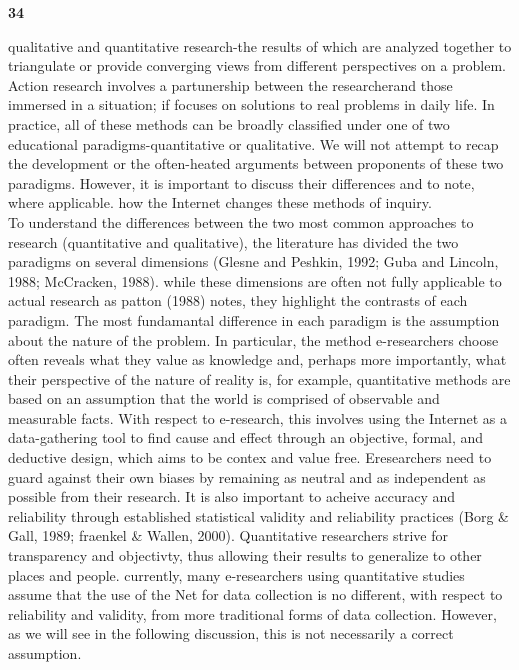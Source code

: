 \documentclass{book}
\begin{document}
\begin{flushright}
\hspace*{0.5cm}
\textbf{34}
\end{flushright}
\vspace*{0.7}
qualitative and quantitative research-the results of which are analyzed together to triangulate or provide converging views from different perspectives on a problem. Action research involves a partunership between the researcherand those immersed in a situation; if focuses on solutions to real problems in daily life. In practice, all of these methods can be broadly classified under one of two educational paradigms-quantitative or qualitative. We will not attempt to recap the development or the often-heated arguments between proponents of these two paradigms. However, it is important to discuss their differences and to note, where applicable. how the Internet changes these methods of inquiry.
\\\hspace*{0.5cm} To understand the differences between the two most common approaches to research (quantitative and qualitative), the literature has divided the two paradigms on several dimensions (Glesne and Peshkin, 1992; Guba and Lincoln, 1988; McCracken, 1988). while these dimensions are often not fully applicable to actual research as patton (1988) notes, they highlight the contrasts of each paradigm. The most fundamantal difference in each paradigm is the assumption about the nature of the problem. In particular, the method e-researchers choose often reveals what they value as knowledge and, perhaps more importantly, what their perspective of the nature of reality is, for example, quantitative methods are based on an assumption that the world is comprised of observable and measurable facts. With respect to e-research, this involves using the Internet as a data-gathering tool to find cause and effect through an objective, formal, and deductive design, which aims to be contex and value free. Eresearchers need to guard against their own biases by remaining as neutral and as independent as possible from their research. It is also important to acheive accuracy and reliability through established statistical validity and reliability practices (Borg & Gall, 1989; fraenkel & Wallen, 2000). Quantitative researchers strive for transparency and objectivty, thus allowing their results to generalize to other places and people. currently, many e-researchers using quantitative studies assume that the use of the Net for data collection is no different, with respect to reliability and validity, from more traditional forms of data collection. However, as we will see in the following discussion, this is not necessarily a correct assumption.
\end{document}
